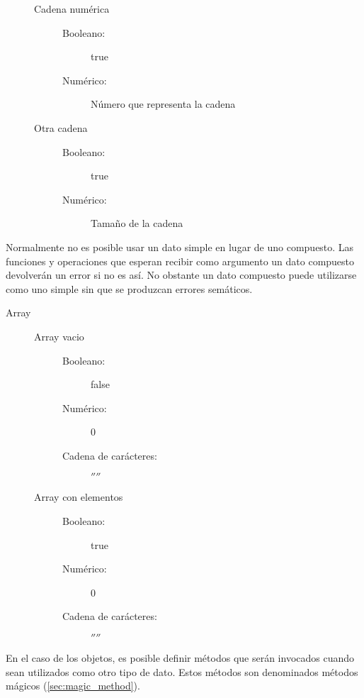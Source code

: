 \begin{description}
\begin{description}
\begin{description}
      \end{description}
   \item[Cadena numérica] \hfill
      \begin{description}
      \item[Booleano:] true 
      \item[Numérico:] Número que representa la cadena
      \end{description}
   \item[Otra cadena] \hfill
      \begin{description}
      \item[Booleano:] true 
      \item[Numérico:] Tamaño de la cadena
      \end{description}
   \end{description}
\end{description}

Normalmente no es posible usar un dato simple en lugar de uno compuesto. Las funciones y operaciones que esperan recibir como argumento
un dato compuesto devolverán un error si no es así. No obstante un dato compuesto puede utilizarse como uno simple sin que se produzcan
errores semáticos.

\begin{description}
\item[Array] \hfill
   \begin{description}
   \item[Array vacio] \hfill
      \begin{description}
      \item[Booleano:] false 
      \item[Numérico:] 0
      \item[Cadena de carácteres:] $''$$''$
      \end{description}
   \item[Array con elementos] \hfill
      \begin{description}
      \item[Booleano:] true 
      \item[Numérico:] 0   
      \item[Cadena de carácteres:] $''$$''$
      \end{description}
   \end{description}
\end{description}

En el caso de los objetos, es posible definir métodos que serán invocados cuando sean utilizados como otro tipo de dato. Estos métodos son denominados 
métodos mágicos (\autoref{sec:magic_method}).

